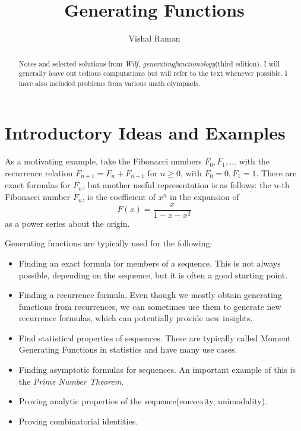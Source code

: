 \documentclass[11pt]{article}
\renewcommand{\>}{\rangle}
\newcommand{\<}{\langle}
\begin{document}
\title{Generating Functions}
\author{Vishal Raman}
\maketitle
\begin{abstract}
Notes and selected solutions from \textit{Wilf, generatingfunctionology}(third edition).  I will generally leave out tedious computations but will refer to the text whenever possible.  I have also included problems from various math olympiads.  
\end{abstract}
\tableofcontents
\pagebreak

\section{Introductory Ideas and Examples}
As a motivating example, take the Fibonacci numbers $F_0, F_1, \dots$ with the recurrence relation $F_{n+1} = F_n + F_{n-1}$ for $n \ge 0$, with $F_0 = 0, F_1 = 1$.  There are exact formulas for $F_n$, but another useful representation is as follows:  the $n$-th Fibonacci number $F_n$, is the coefficient of $x^n$ in the expansion of 
$$F(x) = \frac{x}{1 - x - x^2}$$
as a power series about the origin.  

Generating functions are typically used for the following:
\begin{itemize}
\item Finding an exact formula for members of a sequence.  This is not always possible, depending on the sequence, but it is often a good starting point.
\item Finding a recurrence formula.  Even though we mostly obtain generating functions from recurrences, we can sometimes use them to generate new recurrence formulas, which can potentially provide new insights.
\item Find statistical properties of sequences.  These are typically called Moment Generating Functions in statistics and have many use cases.
\item Finding asymptotic formulas for sequences.  An important example of this is the \textit{Prime Number Theorem}.
\item Proving analytic properties of the sequence(convexity, unimodality).
\item Proving combinatorial identities.  
\end{itemize}
 
\end{document}
